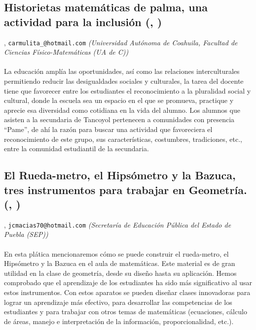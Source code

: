 \subsection{\sffamily Historietas matemáticas de palma, una actividad para la inclusión {\footnotesize (, )}} \label{reg-811} 
, {\tt carmulita_@hotmail.com}  {\slshape (Universidad Autónoma de Coahuila, Facultad de Ciencias Físico-Matemáticas (UA de C))}\\
\\
\noindent La educación amplía las oportunidades, así como las relaciones interculturales permitiendo reducir las desigualdades sociales y culturales, la tarea del docente tiene que favorecer entre los estudiantes el reconocimiento a la pluralidad social y cultural, donde la escuela sea un espacio en el que se promueva, practique y aprecie esa diversidad como cotidiana en la vida del alumno. Los alumnos que asisten a la secundaria de Tancoyol pertenecen a comunidades con presencia “Pame”, de ahí la razón para buscar una actividad que favoreciera el reconocimiento de este grupo, sus características, costumbres, tradiciones, etc., entre la comunidad estudiantil de la secundaria.
\subsection{\sffamily El Rueda-metro, el Hipsómetro y la Bazuca, tres instrumentos para trabajar en Geometría. {\footnotesize (, )}} \label{reg-1582} 
, {\tt jcmacias70@hotmail.com}  {\slshape (Secretaría de Educación Pública del Estado de Puebla (SEP))}\\
\\
\noindent En esta plática mencionaremos cómo se puede construir el rueda-metro, el Hipsómetro y la Bazuca en el aula de matemáticas. Este material es de gran utilidad en la clase de geometría, desde su diseño hasta su aplicación. Hemos comprobado que el aprendizaje de los estudiantes ha sido más significativo al usar estos instrumentos. Con estos aparatos se pueden diseñar clases innovadoras para lograr un aprendizaje más efectivo, para desarrollar las competencias de los estudiantes y para trabajar con otros temas de matemáticas (ecuaciones, cálculo de áreas, manejo e interpretación de la información, proporcionalidad, etc.).
